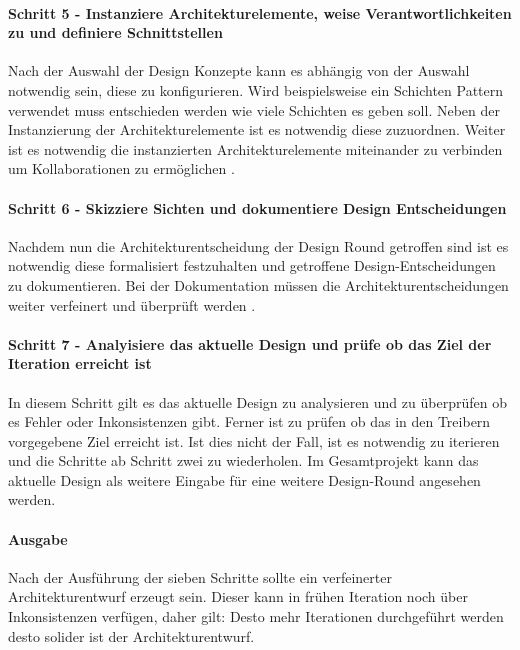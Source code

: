 \paragraph{Schritt 5 - Instanziere Architekturelemente, weise Verantwortlichkeiten zu und definiere Schnittstellen}
Nach der Auswahl der Design Konzepte kann es abhängig von der Auswahl notwendig sein, diese zu konfigurieren. Wird beispielsweise ein Schichten Pattern verwendet muss entschieden werden wie viele Schichten es geben soll. Neben der Instanzierung der Architekturelemente ist es notwendig diese zuzuordnen. Weiter ist es notwendig die instanzierten Architekturelemente miteinander zu verbinden um Kollaborationen zu ermöglichen \cite{Cer01}.\\

\paragraph{Schritt 6 - Skizziere Sichten und dokumentiere Design Entscheidungen}
Nachdem nun die Architekturentscheidung der Design Round getroffen sind ist es notwendig diese formalisiert festzuhalten und getroffene Design-Entscheidungen zu dokumentieren. Bei der Dokumentation müssen die Architekturentscheidungen weiter verfeinert und überprüft werden \cite{Cer01}. \\

\paragraph{Schritt 7 - Analyisiere das aktuelle Design und prüfe ob das Ziel der Iteration erreicht ist}
In diesem Schritt gilt es das aktuelle Design zu analysieren und zu überprüfen ob es Fehler oder Inkonsistenzen gibt. Ferner ist zu prüfen ob das in den Treibern vorgegebene Ziel erreicht ist. Ist dies nicht der Fall, ist es notwendig zu iterieren und die Schritte ab Schritt zwei zu wiederholen. Im Gesamtprojekt kann das aktuelle Design als weitere Eingabe für eine weitere Design-Round angesehen werden. 

\paragraph{Ausgabe}
Nach der Ausführung der sieben Schritte sollte ein verfeinerter Architekturentwurf erzeugt sein. Dieser kann in frühen Iteration noch über Inkonsistenzen verfügen, daher gilt: Desto mehr Iterationen durchgeführt werden desto solider ist der Architekturentwurf.